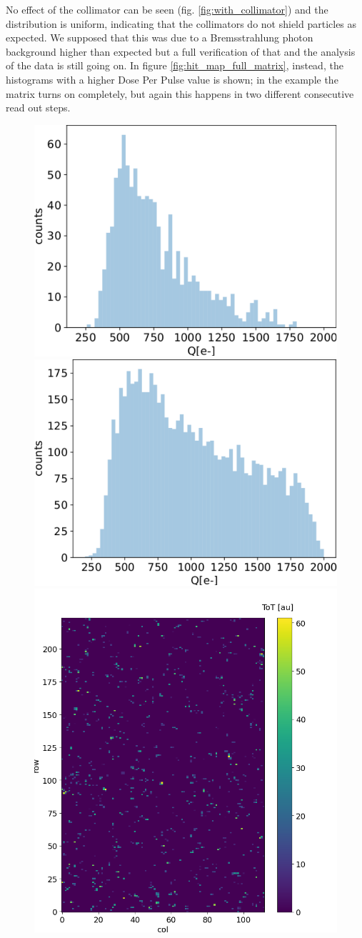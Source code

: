    No effect of the collimator can be seen (fig. \ref{fig:with_collimator}) and the distribution is uniform, indicating that the collimators do not shield particles as expected.
   We supposed that this was due to a Bremsstrahlung photon background higher than expected but a full verification of that and the analysis of the data is still going on. 
   In figure \ref{fig:hit_map_full_matrix}, instead, the histograms with a higher Dose Per Pulse value is shown; in the example the matrix turns on completely, but again this happens in two different consecutive read out steps. 
   \begin{figure}
      \centering
      \includegraphics[width=.49\linewidth]{figures/test_beam/Q1_17_11.pdf}
      \includegraphics[width=.49\linewidth]{figures/test_beam/Q2_17_11.pdf}\\   
      \includegraphics[width=.49\linewidth]{figures/test_beam/tot_mapq1_17-11.png}

\end{figure}
